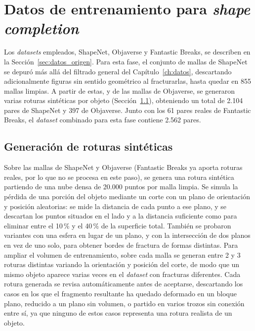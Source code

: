 \documentclass[10pt,a4paper]{report}
\begin{document}
\section{Datos de entrenamiento para \textit{shape completion}}
\label{sec:datos_e3}

Los \textit{datasets} empleados, ShapeNet, Objaverse y Fantastic Breaks, se describen
en la Sección~\ref{sec:datos_origen}. Para esta fase, el conjunto de
mallas de ShapeNet se depuró más allá del filtrado general del Capítulo~\ref{ch:datos},
descartando adicionalmente figuras sin sentido geométrico al fracturarlas, hasta
quedar en 855 mallas limpias. A partir de estas, y de las mallas de Objaverse, se
generaron varias roturas sintéticas por objeto (Sección~\ref{subsec:roturas_sinteticas_e3}),
obteniendo un total de 2.104 pares de ShapeNet y 397 de Objaverse. Junto con los
61 pares reales de Fantastic Breaks, el \textit{dataset} combinado para esta
fase contiene 2.562 pares.

\subsection{Generación de roturas sintéticas}
\label{subsec:roturas_sinteticas_e3}
Sobre las mallas de ShapeNet y Objaverse (Fantastic Breaks ya aporta roturas reales,
por lo que no se procesa en este paso), se genera una rotura sintética partiendo de
una nube densa de 20.000 puntos por malla limpia. Se simula la pérdida de una porción
del objeto mediante un corte con un plano de orientación y posición aleatorias: se
mide la distancia de cada punto a ese plano, y se descartan los puntos situados en el
lado y a la distancia suficiente como para eliminar entre el 10\,\% y el 40\,\% de la
superficie total. También se probaron variantes con una esfera en lugar de un plano, y
con la intersección de dos planos en vez de uno solo, para obtener bordes de fractura
de formas distintas. Para ampliar el volumen de entrenamiento, sobre cada malla se generan entre 2 y
3 roturas distintas variando la orientación y posición del corte, de modo que un mismo
objeto aparece varias veces en el \textit{dataset} con fracturas diferentes. Cada
rotura generada se revisa automáticamente antes de aceptarse, descartando los casos en
los que el fragmento resultante ha quedado deformado en un bloque plano, reducido a un
plano sin volumen, o partido en varios trozos sin conexión entre sí, ya que ninguno de
estos casos representa una rotura realista de un objeto.
\end{document}
